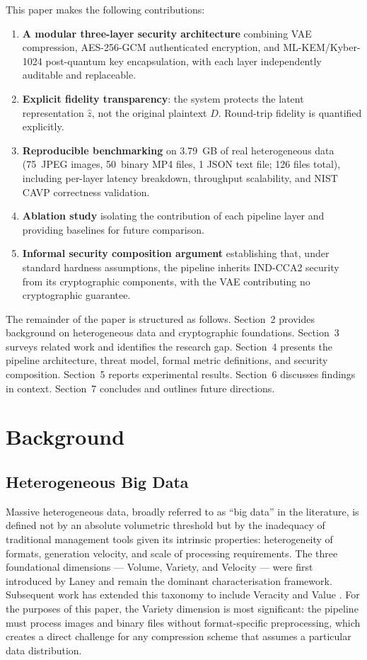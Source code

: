 \documentclass[twocolumn]{article}
\begin{document}
This paper makes the following contributions:
\begin{enumerate}
  \item \textbf{A modular three-layer security architecture} combining VAE
  compression, AES-256-GCM authenticated encryption, and ML-KEM/Kyber-1024
  post-quantum key encapsulation, with each layer independently auditable and
  replaceable.
  \item \textbf{Explicit fidelity transparency}: the system protects the latent
  representation $\hat{z}$, not the original plaintext $D$. Round-trip fidelity
  is quantified explicitly.
  \item \textbf{Reproducible benchmarking} on 3.79~GB of real heterogeneous data
  (75~JPEG images, 50~binary MP4 files, 1 JSON text file; 126 files total),
  including per-layer latency breakdown, throughput scalability, and NIST CAVP
  correctness validation.
  \item \textbf{Ablation study} isolating the contribution of each pipeline layer
  and providing baselines for future comparison.
  \item \textbf{Informal security composition argument} establishing that, under
  standard hardness assumptions, the pipeline inherits IND-CCA2 security from its
  cryptographic components, with the VAE contributing no cryptographic guarantee.
\end{enumerate}

The remainder of the paper is structured as follows. Section~2 provides
background on heterogeneous data and cryptographic foundations. Section~3 surveys
related work and identifies the research gap. Section~4 presents the pipeline
architecture, threat model, formal metric definitions, and security composition.
Section~5 reports experimental results. Section~6 discusses findings in context.
Section~7 concludes and outlines future directions.

\section{Background}

\subsection{Heterogeneous Big Data}

Massive heterogeneous data, broadly referred to as ``big data'' in the
literature, is defined not by an absolute volumetric threshold but by the
inadequacy of traditional management tools given its intrinsic properties:
heterogeneity of formats, generation velocity, and scale of processing
requirements. The three foundational dimensions --- Volume, Variety, and Velocity
--- were first introduced by Laney \cite{laney2001} and remain the dominant
characterisation framework. Subsequent work has extended this taxonomy to include
Veracity and Value \cite{gandomi2015}. For the purposes of this paper, the
Variety dimension is most significant: the pipeline must process images and binary
files without format-specific preprocessing, which creates a direct challenge for
any compression scheme that assumes a particular data distribution.
\end{document}
